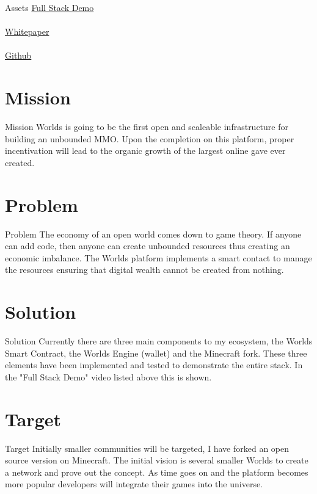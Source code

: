 \documentclass[final, ngerman, xcolor=pdftex, dvipsnames, table, aspectratio=169, 14pt]{beamer}
\begin{document}
\begin{frame}{Assets}
\href{https://www.youtube.com/watch?v=OrOZVr-j92A}{Full Stack Demo}
\\~\\

\href{https://github.com/Machine-Hum/Worlds/raw/master/Worlds-Whitepaper/whitepaper.pdf}{Whitepaper}
\\~\\

\href{worldsmmo.com}{Github}
\end{frame}

\section{Mission}
\begin{frame}{Mission}
Worlds is going to be the first open and scaleable infrastructure for building an unbounded MMO. Upon the completion on this platform, proper incentivation will lead to the organic growth of the largest online gave ever created.
\end{frame}

\section{Problem}
\begin{frame}{Problem}
The economy of an open world comes down to game theory. If anyone can add code, then anyone can create unbounded resources thus creating an economic imbalance. The Worlds platform implements a smart contact to manage the resources ensuring that digital wealth cannot be created from nothing.  
\end{frame}

\section{Solution}
\begin{frame}{Solution}
Currently there are three main components to my ecosystem, the Worlds Smart Contract, the Worlds Engine (wallet) and the Minecraft fork. These three elements have been implemented and tested to demonstrate the entire stack. In the "Full Stack Demo" video listed above this is shown.
\end{frame}

\section{Target}
\begin{frame}{Target}
Initially smaller communities will be targeted, I have forked an open source version on Minecraft. The initial vision is several smaller Worlds to create a network and prove out the concept. As time goes on and the platform becomes more popular developers will integrate their games into the universe.
\end{frame}
\end{document}
